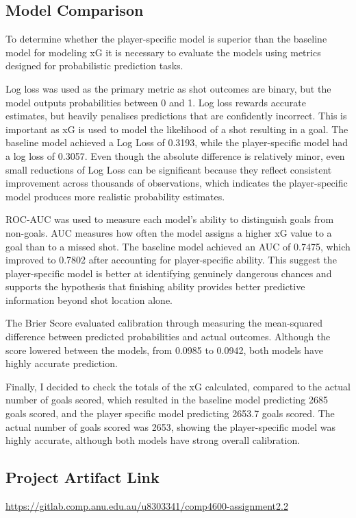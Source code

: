 \documentclass{article}
\begin{document}
\subsection{Model Comparison}
To determine whether the player-specific model is superior than the baseline model for modeling xG it is necessary to evaluate the models using metrics designed for probabilistic prediction tasks.

Log loss was used as the primary metric as shot outcomes are binary, but the model outputs probabilities between 0 and 1. Log loss rewards accurate estimates, but heavily penalises predictions that are confidently incorrect. This is important as xG is used to model the likelihood of a shot resulting in a goal. The baseline model achieved a Log Loss of 0.3193, while the player-specific model had a log loss of 0.3057. Even though the absolute difference is relatively minor, even small reductions of Log Loss can be significant because they reflect consistent improvement across thousands of observations, which indicates the player-specific model produces more realistic probability estimates.

ROC-AUC was used to measure each model's ability to distinguish goals from non-goals. AUC measures how often the model assigns a higher xG value to a goal than to a missed shot. The baseline model achieved an AUC of 0.7475, which improved to 0.7802 after accounting for player-specific ability. This suggest the player-specific model is better at identifying genuinely dangerous chances and supports the hypothesis that finishing ability provides better predictive information beyond shot location alone.

The Brier Score evaluated calibration through measuring the mean-squared difference between predicted probabilities and actual outcomes. Although the score lowered between the models, from 0.0985 to 0.0942, both models have highly accurate prediction.

Finally, I decided to check the totals of the xG calculated, compared to the actual number of goals scored, which resulted in the baseline model predicting 2685 goals  scored, and the player specific model predicting 2653.7 goals scored. The actual number of goals scored was 2653, showing the player-specific model was highly accurate, although both models have strong overall calibration.

\subsection{Project Artifact Link}
\url{https://gitlab.comp.anu.edu.au/u8303341/comp4600-assignment2.2}
\end{document}
